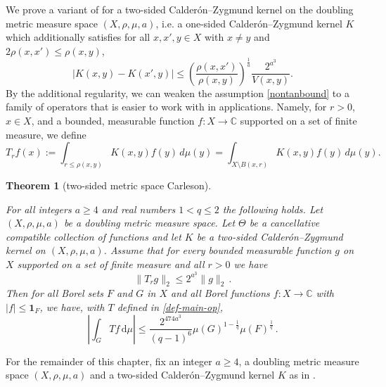 \documentclass[10pt,a4paper]{article}
\theoremstyle{plain}
\newtheorem{theorem}{Theorem}[subsection]
\theoremstyle{definition}
\numberwithin{equation}{subsection}
\newcommand{\Mf}{{\Theta}}
\newcommand{\lean}[1]{}
\newcommand{\uses}[1]{}
\newcommand{\leanok}{}
\def\C{\mathbb{C}}
\begin{document}
We prove a variant of  for a two-sided Calder\'on--Zygmund kernel on the doubling metric measure space $(X,\rho,\mu,a)$, i.e. a one-sided Calder\'on--Zygmund kernel $K$ which additionally satisfies for all $x,x',y\in X$ with $x\neq y$ and $2\rho(x,x') \leq \rho(x,y)$,
\begin{equation}
    \label{eqkernel-x-smooth}
    |K(x,y) - K(x',y)| \leq \left(\frac{\rho(x,x')}{\rho(x,y)}\right)^{\frac{1}{a}}\frac{2^{a^3}}{V(x,y)}.
\end{equation}
By the additional regularity, we can weaken the assumption \eqref{nontanbound} to a family of operators that is easier to work with in applications.
Namely, for $r > 0$, $x\in X$, and a bounded, measurable function $f:X\to\C$ supported on a set of finite measure, we define
\begin{equation}
\label{def-T-r}
T_r f(x):= \int_{r\le\rho(x,y)} K(x,y) f(y) \, d\mu(y) = \int_{X\setminus B(x,r)} K(x,y) f(y) \, d\mu(y).
\end{equation}
\begin{theorem}[two-sided metric space Carleson]
    \label{two-sided-metric-space-Carleson}
    \uses{metric-space-Carleson, nontangential-from-simple}
    \leanok
    \lean{two_sided_metric_carleson}
        For all  integers $a \ge  4$ and real numbers $1<q\le 2$
        the following holds.
        Let $(X,\rho,\mu,a)$ be a doubling metric measure space. Let  $\Mf$ be a
        cancellative compatible  collection of functions and let $K$ be a two-sided Calder\'on--Zygmund kernel on $(X,\rho,\mu,a)$. Assume  that for every bounded measurable function $g$ on $X$ supported on a set of finite measure and all $r>0$ we have
      \begin{equation}\label{two-sided-Hr-bound-assumption}
            \|T_r g\|_{2} \leq 2^{a^3} \|g\|_2\,.
        \end{equation}
        Then for all Borel sets $F$ and $G$ in $X$ and
        all Borel functions $f:X\to \C$ with
        $|f|\le \mathbf{1}_F$, we have, with $T$ defined in \eqref{def-main-op},
      \begin{equation}
        \label{two-sided-resweak}
            \left|\int_{G} T f \, \mathrm{d}\mu\right| \leq \frac{2^{474a^3}}{(q-1)^6} \mu(G)^{1-\frac{1}{q}} \mu(F)^{\frac{1}{q}}\, .
        \end{equation}
\end{theorem}

For the remainder of this chapter, fix an integer $a\ge 4$, a doubling metric measure space $(X,\rho,\mu,a)$ and a two-sided Calder\'on--Zygmund kernel $K$ as in .
\end{document}
